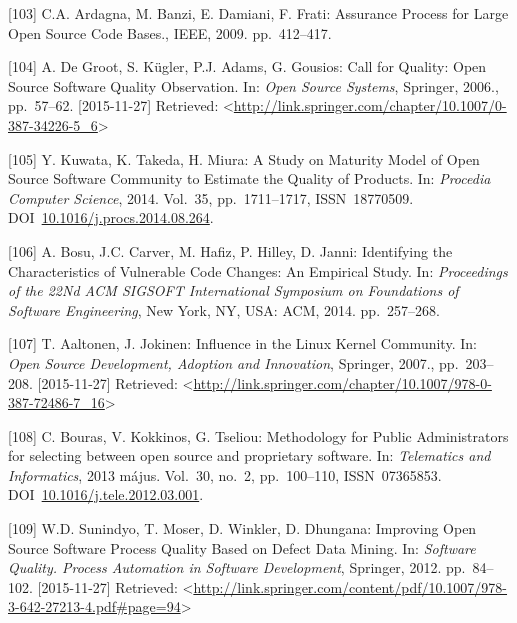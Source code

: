 \documentclass[12pt,magyar,a4paper,oneside]{scrreprt}
\begin{document}
\leavevmode\hypertarget{ref-ardagna_assurance_2009}{}%
{[}103{]} C.A. Ardagna, M. Banzi, E. Damiani, F. Frati: Assurance
Process for Large Open Source Code Bases., IEEE, 2009. pp.~412--417.

\leavevmode\hypertarget{ref-de_groot_call_2006}{}%
{[}104{]} A. De Groot, S. Kügler, P.J. Adams, G. Gousios: Call for
Quality: Open Source Software Quality Observation. In: \emph{Open Source
Systems}, Springer, 2006., pp.~57--62. {[}2015-11-27{]} Retrieved:
\textless{}\url{http://link.springer.com/chapter/10.1007/0-387-34226-5_6}\textgreater{}

\leavevmode\hypertarget{ref-kuwata_study_2014}{}%
{[}105{]} Y. Kuwata, K. Takeda, H. Miura: A Study on Maturity Model of
Open Source Software Community to Estimate the Quality of Products. In:
\emph{Procedia Computer Science}, 2014. Vol.~35, pp.~1711--1717,
ISSN~18770509.
DOI~\href{https://doi.org/10.1016/j.procs.2014.08.264}{10.1016/j.procs.2014.08.264}.

\leavevmode\hypertarget{ref-bosu_identifying_2014}{}%
{[}106{]} A. Bosu, J.C. Carver, M. Hafiz, P. Hilley, D. Janni:
Identifying the Characteristics of Vulnerable Code Changes: An Empirical
Study. In: \emph{Proceedings of the 22Nd ACM SIGSOFT International
Symposium on Foundations of Software Engineering}, New York, NY, USA:
ACM, 2014. pp.~257--268.

\leavevmode\hypertarget{ref-aaltonen_influence_2007}{}%
{[}107{]} T. Aaltonen, J. Jokinen: Influence in the Linux Kernel
Community. In: \emph{Open Source Development, Adoption and Innovation},
Springer, 2007., pp.~203--208. {[}2015-11-27{]} Retrieved:
\textless{}\url{http://link.springer.com/chapter/10.1007/978-0-387-72486-7_16}\textgreater{}

\leavevmode\hypertarget{ref-bouras_methodology_2013}{}%
{[}108{]} C. Bouras, V. Kokkinos, G. Tseliou: Methodology for Public
Administrators for selecting between open source and proprietary
software. In: \emph{Telematics and Informatics}, 2013 május. Vol.~30,
no.~2, pp.~100--110, ISSN~07365853.
DOI~\href{https://doi.org/10.1016/j.tele.2012.03.001}{10.1016/j.tele.2012.03.001}.

\leavevmode\hypertarget{ref-sunindyo_improving_2012}{}%
{[}109{]} W.D. Sunindyo, T. Moser, D. Winkler, D. Dhungana: Improving
Open Source Software Process Quality Based on Defect Data Mining. In:
\emph{Software Quality. Process Automation in Software Development},
Springer, 2012. pp.~84--102. {[}2015-11-27{]} Retrieved:
\textless{}\url{http://link.springer.com/content/pdf/10.1007/978-3-642-27213-4.pdf\#page=94}\textgreater{}
\end{document}
